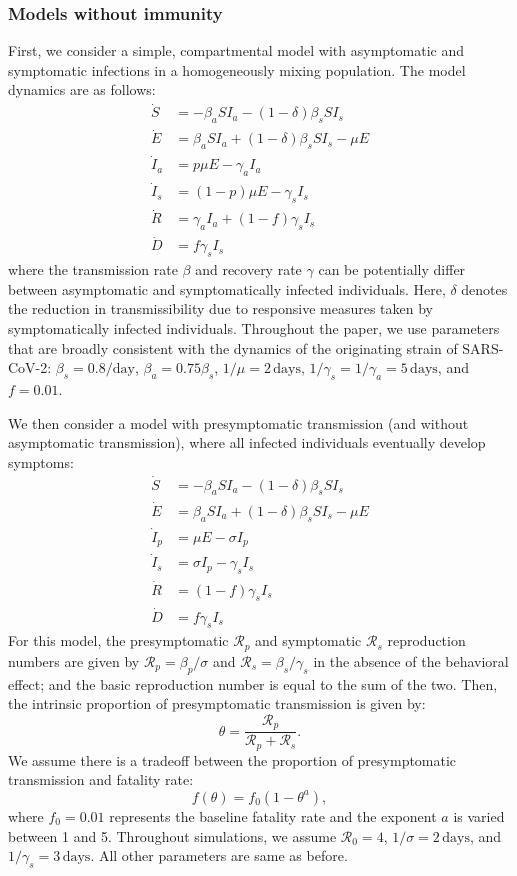 \documentclass[12pt]{article}
\newcommand{\RR}{\ensuremath{{\mathcal R}}\xspace}
\begin{document}
\subsubsection*{Models without immunity}

First, we consider a simple, compartmental model with asymptomatic and symptomatic infections in a homogeneously mixing population.
The model dynamics are as follows:
\begin{align}
\dot{S} &= -\beta_a S I_a -(1-\delta) \beta_s S I_s \\
\dot{E} &= \beta_a S I_a + (1-\delta) \beta_s S I_s - \mu E\\
\dot{I}_a &= p \mu E - \gamma_a I_a\\
\dot{I}_s &= (1-p) \mu E -\gamma_s I_s\\
\dot{R} &= \gamma_a I_a + (1-f) \gamma_s I_s \\
\dot{D} &= f \gamma_s I_s
\end{align}
where the transmission rate $\beta$ and recovery rate $\gamma$ can be potentially differ between asymptomatic and symptomatically infected individuals.  
Here, $\delta$ denotes the reduction in transmissibility due to responsive measures taken by symptomatically infected individuals.
Throughout the paper, we use parameters that are broadly consistent with the dynamics of the originating strain of SARS-CoV-2: $\beta_s = 0.8/\mathrm{day}$, $\beta_a = 0.75 \beta_s$, $1/\mu=2\,\mathrm{days}$, $1/\gamma_s=1/\gamma_a=5\,\mathrm{days}$, and $f=0.01$.

We then consider a model with presymptomatic transmission (and without asymptomatic transmission), where all infected individuals eventually develop symptoms:
\begin{align}
\dot{S} &= -\beta_a S I_a -(1-\delta) \beta_s S I_s \\
\dot{E} &= \beta_a S I_a + (1-\delta) \beta_s S I_s - \mu E\\
\dot{I}_p &= \mu E - \sigma I_p\\
\dot{I}_s &= \sigma I_p -\gamma_s I_s\\
\dot{R} &= (1-f) \gamma_s I_s \\
\dot{D} &= f \gamma_s I_s
\end{align}
For this model, the presymptomatic $\RR_p$ and symptomatic $\RR_s$ reproduction numbers are given by $\RR_p = \beta_p/\sigma$ and $\RR_s=\beta_s/\gamma_s$ in the absence of the behavioral effect; and the basic reproduction number is equal to the sum of the two.
Then, the intrinsic proportion of presymptomatic transmission is given by: 
\begin{equation}
\theta = \frac{\RR_p}{\RR_p + \RR_s}.
\end{equation}
We assume there is a tradeoff between the proportion of presymptomatic transmission and fatality rate: 
\begin{equation}
f(\theta) = f_0 (1-\theta^a),
\end{equation}
where $f_0=0.01$ represents the baseline fatality rate and the exponent $a$ is varied between 1 and 5.
Throughout simulations, we assume $\mathcal R_0 = 4$, $1/\sigma=2\,\mathrm{days}$, and $1/\gamma_s=3\,\mathrm{days}$.
All other parameters are same as before.
\end{document}

